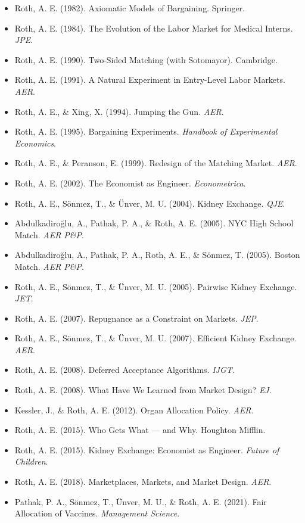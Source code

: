 \begin{itemize}
    \item Roth, A. E. (1982). Axiomatic Models of Bargaining. Springer.
    \item Roth, A. E. (1984). The Evolution of the Labor Market for Medical Interns. \textit{JPE}.
    \item Roth, A. E. (1990). Two-Sided Matching (with Sotomayor). Cambridge.
    \item Roth, A. E. (1991). A Natural Experiment in Entry-Level Labor Markets. \textit{AER}.
    \item Roth, A. E., \& Xing, X. (1994). Jumping the Gun. \textit{AER}.
    \item Roth, A. E. (1995). Bargaining Experiments. \textit{Handbook of Experimental Economics}.
    \item Roth, A. E., \& Peranson, E. (1999). Redesign of the Matching Market. \textit{AER}.
    \item Roth, A. E. (2002). The Economist as Engineer. \textit{Econometrica}.
    \item Roth, A. E., Sönmez, T., \& Ünver, M. U. (2004). Kidney Exchange. \textit{QJE}.
    \item Abdulkadiroğlu, A., Pathak, P. A., \& Roth, A. E. (2005). NYC High School Match. \textit{AER P\&P}.
    \item Abdulkadiroğlu, A., Pathak, P. A., Roth, A. E., \& Sönmez, T. (2005). Boston Match. \textit{AER P\&P}.
    \item Roth, A. E., Sönmez, T., \& Ünver, M. U. (2005). Pairwise Kidney Exchange. \textit{JET}.
    \item Roth, A. E. (2007). Repugnance as a Constraint on Markets. \textit{JEP}.
    \item Roth, A. E., Sönmez, T., \& Ünver, M. U. (2007). Efficient Kidney Exchange. \textit{AER}.
    \item Roth, A. E. (2008). Deferred Acceptance Algorithms. \textit{IJGT}.
    \item Roth, A. E. (2008). What Have We Learned from Market Design? \textit{EJ}.
    \item Kessler, J., \& Roth, A. E. (2012). Organ Allocation Policy. \textit{AER}.
    \item Roth, A. E. (2015). Who Gets What — and Why. Houghton Mifflin.
    \item Roth, A. E. (2015). Kidney Exchange: Economist as Engineer. \textit{Future of Children}.
    \item Roth, A. E. (2018). Marketplaces, Markets, and Market Design. \textit{AER}.
    \item Pathak, P. A., Sönmez, T., Ünver, M. U., \& Roth, A. E. (2021). Fair Allocation of Vaccines. \textit{Management Science}.
\end{itemize}

